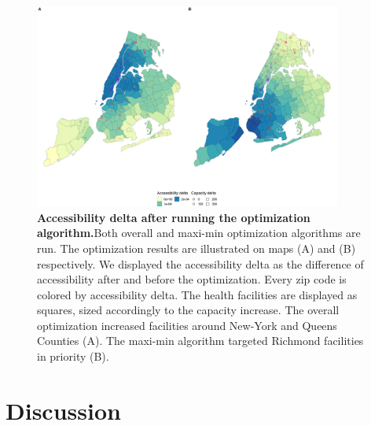 \begin{figure}[H]
    \includegraphics[width=0.9\textwidth]{images/camion-ny/fig3.png}
    \centering
    \caption{
        \textbf{Accessibility delta after running the optimization algorithm.}Both overall and maxi-min optimization algorithms are run. The optimization results are illustrated on maps (A) and (B) respectively. We displayed the accessibility delta as the difference of accessibility after and before the optimization. Every zip code is colored by accessibility delta. The health facilities are displayed as squares, sized accordingly to the capacity increase. The overall optimization increased facilities around New-York and Queens Counties (A). The maxi-min algorithm targeted Richmond facilities in priority (B).
    }
    \label{fig:camion-ny-optim}
\end{figure}

\section{Discussion}

